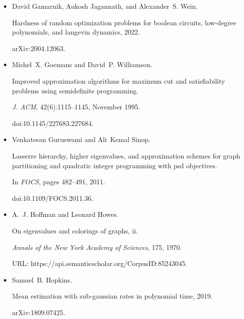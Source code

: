 \begin{itemize}
\item[] 
[15]

David Gamarnik, Aukosh Jagannath, and Alexander S. Wein.


Hardness of random optimization problems for boolean circuits,
low-degree polynomials, and langevin dynamics, 2022.


arXiv:2004.12063.





\item[] 
[16]

Michel X. Goemans and David P. Williamson.


Improved approximation algorithms for maximum cut and satisfiability
problems using semidefinite programming.


\emph{J. ACM}, 42(6):1115–1145, November 1995.


doi:10.1145/227683.227684.





\item[] 
[17]

Venkatesan Guruswami and Ali Kemal Sinop.


Lasserre hierarchy, higher eigenvalues, and approximation schemes for
graph partitioning and quadratic integer programming with psd objectives.


In \emph{FOCS}, pages 482–491, 2011.


doi:10.1109/FOCS.2011.36.





\item[] 
[18]

A. J. Hoffman and Leonard Howes.


On eigenvalues and colorings of graphs, ii.


\emph{Annals of the New York Academy of Sciences}, 175, 1970.


URL: https://api.semanticscholar.org/CorpusID:85243045.





\item[] 
[19]

Samuel B. Hopkins.


Mean estimation with sub-gaussian rates in polynomial time, 2019.


arXiv:1809.07425.






\end{itemize}
